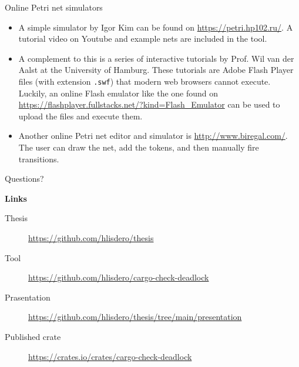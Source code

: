 \documentclass{beamer}
\begin{document}
\begin{frame}{Online Petri net simulators}
  \begin{itemize}
    \item A simple simulator by Igor Kim can be found on \url{https://petri.hp102.ru/}.
          A tutorial video on Youtube and example nets are included in the tool.
    \item A complement to this is a series of interactive tutorials by Prof. Wil van der Aalst
          at the University of Hamburg. These tutorials are Adobe Flash Player files (with extension \texttt{.swf})
          that modern web browsers cannot execute.
          Luckily, an online Flash emulator like the one found on \url{https://flashplayer.fullstacks.net/?kind=Flash_Emulator}
          can be used to upload the files and execute them.
    \item Another online Petri net editor and simulator is \url{http://www.biregal.com/}.
          The user can draw the net, add the tokens, and then manually fire transitions.
  \end{itemize}
\end{frame}

\begin{frame}{}
  \huge
  \centering
  Questions?


  \vfill
  \raggedright
  \normalsize
  \textbf{Links}
  
  \scriptsize

  \begin{description}
    \item [Thesis] \url{https://github.com/hlisdero/thesis}
    \item [Tool] \url{https://github.com/hlisdero/cargo-check-deadlock}
    \item [Prasentation] \url{https://github.com/hlisdero/thesis/tree/main/presentation}
    \item [Published crate] \url{https://crates.io/crates/cargo-check-deadlock}
  \end{description}
\end{frame}
\end{document}
